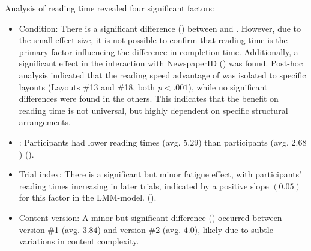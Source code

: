 Analysis of reading time revealed four significant factors: 
\begin{itemize}

    \item {Condition}: There is a significant difference () between \condtwonot and \condonenot {}. However, due to the small effect size, it is not possible to confirm that reading time is the primary factor influencing the difference in completion time. 
    Additionally, a significant effect in the interaction with NewspaperID () was found. Post-hoc analysis indicated that the reading speed advantage of \condtwonot was isolated to specific layouts (Layouts \#13 and \#18, both $p<.001$), while no significant differences were found in the others. This indicates that the benefit on reading time is not universal, but highly dependent on specific structural arrangements.

    \item {\CVAS:} Participants \LV had lower reading times (avg. $5.29$\seconds) than participants \NV (avg. $2.68$\seconds) ().

    \item {Trial index:} There is a significant but minor fatigue effect, with participants' reading times increasing in later trials, indicated by a positive slope $(0.05)$ for this factor in the LMM-model. ().

    \item {Content version:} A minor but significant difference () occurred between version \#1 (avg. $3.84$\seconds) and version \#2 (avg. $4.0$\seconds), likely due to subtle variations in content complexity.
\end{itemize}

